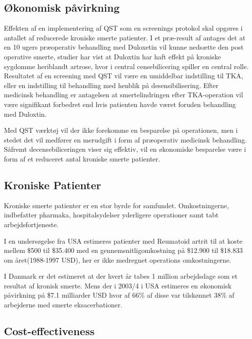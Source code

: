 \subsection{Økonomisk påvirkning} %
Effekten af en implementering af QST som en screenings protokol skal opgøres i antallet af reducerede kroniske smerte patienter. I et præ-result af  antages det at en 10 ugers præoperativ behandling med Duloxetin vil kunne nedsætte den post operative smerte, studier har vist at Duloxtin har haft effekt på kroniske sygdomme heriblandt artrose, hvor i central censebilicering spiller en central rolle. \citep{Blikman2016} Resultatet af en screening med QST vil være en umiddelbar indstilling til TKA, eller en indstilling til behandling med henblik på desensibilisering. Efter medicinsk behandling er antagelsen at smertelindringen efter TKA-operation vil være signifikant forbedret end hvis patienten havde været foruden behandling med Duloxtin.

Med QST værktøj vil der ikke forekomme en besparelse på operationen, men i stedet det vil medfører en merudgift i form af præoperativ medicinsk behandling. Såfremt decensebiliceringen viser sig effektiv, vil en økonomiske besparelse være i form af et reduceret antal kroniske smerte patienter.

\subsection{Kroniske Patienter}

Kroniske smerte patienter er en stor byrde for samfundet. Omkostningerne, indbefatter pharmaka, hospitalsydelser yderligere operationer samt tabt arbejdsfortjeneste. 

I en undersøgelse fra USA estimeres patienter med Reumatoid artrit til at koste mellem \$500 til \$35.400 med en gennemsnitligomkostning på \$12.900 til \$18.833  om året(1988-1997 USD), her er ikke medregnet operations omkostningerne.\citep{Turk2002}

I Danmark er det estimeret at der hvert år tabes 1 million arbejdsdage som et resultat af kronisk smerte.\citep{Eriksen2006} Mens der i 2003/4 i USA estimeres en økonomisk påvirkning på \$7.1 milliarder USD hvor af 66\% af disse var tilskønnet 38\% af arbejderne med smerte eksacerbationer. \citep{Phillips2009}

\subsection{Cost-effectiveness}

